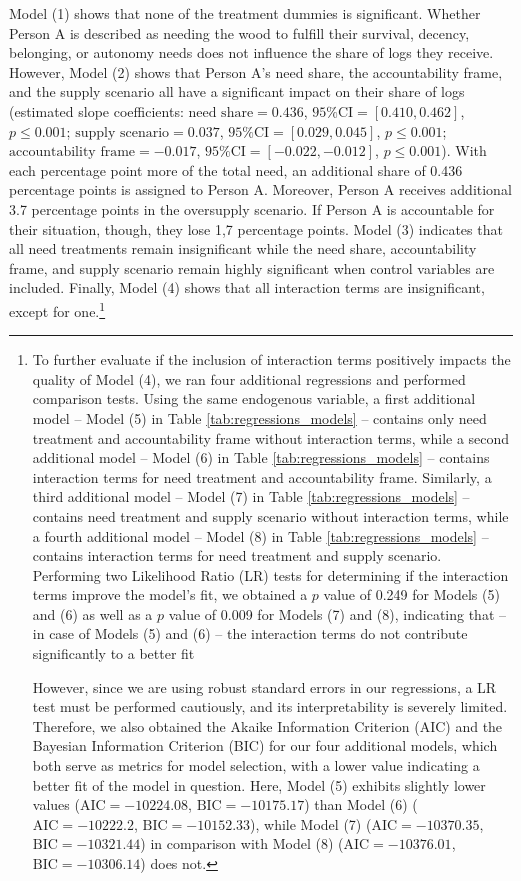 \documentclass[egregdoesnotlikesansseriftitles]{scrartcl}
\begin{document}
Model (1) shows that none of the treatment dummies is significant.
Whether Person A is described as needing the wood to fulfill their survival, decency, belonging, or autonomy needs does not influence the share of logs they receive.
However, Model (2) shows that Person A's need share, the accountability frame, and the supply scenario all have a significant impact on their share of logs (estimated slope coefficients: $\text{need share}=0.436$, $\text{95\% CI}=[0.410,0.462]$, $p\le0.001$; $\text{supply scenario}=0.037$, $\text{95\% CI}=[0.029,0.045]$, $p\le0.001$; $\text{accountability frame}=-0.017$, $\text{95\% CI}=[-0.022,-0.012]$, $p\le0.001$).
With each percentage point more of the total need, an additional share of 0.436 percentage points is assigned to Person A.
Moreover, Person A receives additional 3.7 percentage points in the oversupply scenario.
If Person A is accountable for their situation, though, they lose 1,7 percentage points.
Model (3) indicates that all need treatments remain insignificant while the need share, accountability frame, and supply scenario remain highly significant when control variables are included.
Finally, Model (4) shows that all interaction terms are insignificant, except for one.\footnote{To further evaluate if the inclusion of interaction terms positively impacts the quality of Model (4), we ran four additional regressions and performed comparison tests.
Using the same endogenous variable, a first additional model -- Model (5) in Table \ref{tab:regressions_models} -- contains only need treatment and accountability frame without interaction terms, while a second additional model -- Model (6) in Table \ref{tab:regressions_models} -- contains interaction terms for need treatment and accountability frame.
Similarly, a third additional model -- Model (7) in Table \ref{tab:regressions_models} -- contains need treatment and supply scenario without interaction terms, while a fourth additional model -- Model (8) in Table \ref{tab:regressions_models} -- contains interaction terms for need treatment and supply scenario.
Performing two Likelihood Ratio (LR) tests for determining if the interaction terms improve the model's fit, we obtained a $p$ value of 0.249 for Models (5) and (6) as well as a $p$ value of 0.009 for Models (7) and (8), indicating that -- in case of Models (5) and (6) -- the interaction terms do not contribute significantly to a better fit

However, since we are using robust standard errors in our regressions, a LR test must be performed cautiously, and its interpretability is severely limited.
Therefore, we also obtained the Akaike Information Criterion (AIC) and the Bayesian Information Criterion (BIC) for our four additional models, which both serve as metrics for model selection, with a lower value indicating a better fit of the model in question.
Here, Model (5) exhibits slightly lower values ($\text{AIC}=-10224.08$, $\text{BIC}=-10175.17$) than Model (6) ($\text{AIC}=-10222.2$, $\text{BIC}=-10152.33$), while Model (7) ($\text{AIC}=-10370.35$, $\text{BIC}=-10321.44$) in comparison with Model (8) ($\text{AIC}=-10376.01$, $\text{BIC}=-10306.14$) does not.}
\end{document}
